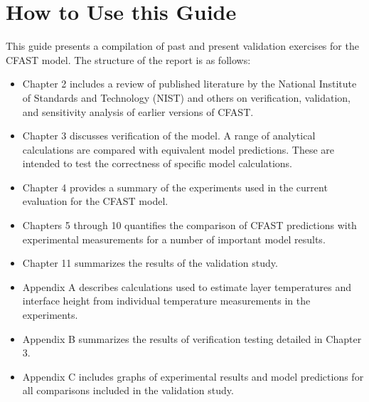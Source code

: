 \section{How to Use this Guide}

This guide presents a compilation of past and present validation exercises for the CFAST model.  The structure of the report is as follows:

\begin{itemize}
\item Chapter 2 includes a review of published literature by the National Institute of Standards and Technology (NIST) and others on verification, validation, and sensitivity analysis of earlier versions of CFAST.
\item Chapter 3 discusses verification of the model.  A range of analytical calculations are compared with equivalent model predictions. These are intended to test the correctness of specific model calculations.
\item Chapter 4 provides a summary of the experiments used in the current evaluation for the CFAST model.
\item Chapters 5 through 10 quantifies the comparison of CFAST predictions with experimental measurements for a number of important model results.
\item Chapter 11 summarizes the results of the validation study.
\item Appendix A describes calculations used to estimate layer temperatures and interface height from individual temperature measurements in the experiments.
\item Appendix B summarizes the results of verification testing detailed in Chapter 3.
\item Appendix C includes graphs of experimental results and model predictions for all comparisons included in the validation study.
\end{itemize}



